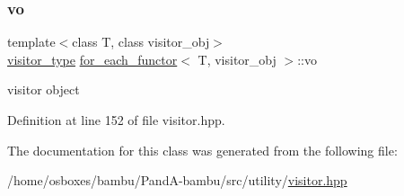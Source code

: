 \subsubsection{\texorpdfstring{vo}{vo}}
{\footnotesize\ttfamily template$<$class T, class visitor\+\_\+obj$>$ \\
\hyperlink{classfor__each__functor_ad8dbe39e38c2b3c71543522a86565122}{visitor\+\_\+type} \hyperlink{classfor__each__functor}{for\+\_\+each\+\_\+functor}$<$ T, visitor\+\_\+obj $>$\+::vo\hspace{0.3cm}{\ttfamily [private]}}



visitor object 



Definition at line 152 of file visitor.\+hpp.



The documentation for this class was generated from the following file\+:\begin{DoxyCompactItemize}
\item 
/home/osboxes/bambu/\+Pand\+A-\/bambu/src/utility/\hyperlink{visitor_8hpp}{visitor.\+hpp}\end{DoxyCompactItemize}
